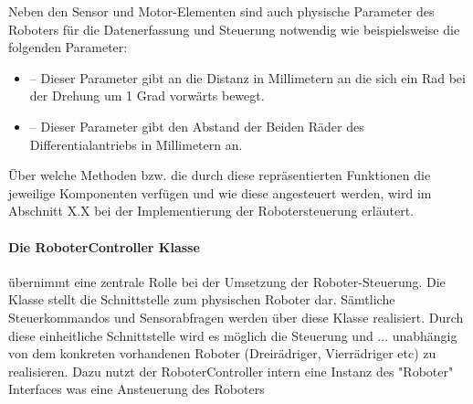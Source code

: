 Neben den Sensor und Motor-Elementen sind auch physische Parameter des Roboters für die Datenerfassung und Steuerung notwendig wie
beispielsweise die folgenden Parameter:
\begin{itemize}
	\item{} -- Dieser Parameter gibt an die Distanz in Millimetern 
	an die sich ein Rad bei der Drehung um 1 Grad vorwärts bewegt.  
	\item{} -- Dieser Parameter gibt den Abstand der Beiden Räder 
	des Differentialantriebs in Millimetern an.
\end{itemize}
Über welche Methoden bzw. die durch diese repräsentierten Funktionen die jeweilige Komponenten verfügen und wie diese angesteuert 
werden, wird im Abschnitt X.X bei der Implementierung der Robotersteuerung erläutert.
\paragraph{Die RoboterController Klasse} übernimmt eine zentrale Rolle bei der Umsetzung der Roboter-Steuerung. Die Klasse stellt die 
Schnittstelle zum physischen Roboter dar. Sämtliche Steuerkommandos und Sensorabfragen werden über diese Klasse realisiert. Durch diese einheitliche 
Schnittstelle wird es möglich die Steuerung und ... unabhängig von dem konkreten vorhandenen Roboter (Dreirädriger, Vierrädriger etc)
zu realisieren. Dazu nutzt der RoboterController intern eine Instanz des "Roboter" Interfaces was eine Ansteuerung des Roboters 
\\
